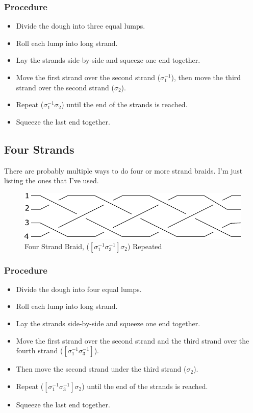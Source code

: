 \documentclass[10pt, openany]{book}
\begin{document}
\subsubsection{Procedure}
\begin{itemize}
  \item Divide the dough into three equal lumps.
  \item Roll each lump into long strand.
  \item Lay the strands side-by-side and squeeze one end together.
  \item Move the first strand over the second strand ($\sigma^{-1}_1$), then move the third strand over the second strand ($\sigma_2$).
  \item Repeat ($\sigma^{-1}_1\sigma_2$) until the end of the strands is reached.
  \item Squeeze the last end together.
\end{itemize}

\subsection{Four Strands}
There are probably multiple ways to do four or more strand braids.  I'm just listing the ones that I've used.

\begin{figure}[h]
  \center
  \includegraphics{Figures/4-strands.pdf}
  \caption{Four Strand Braid, ($[\sigma^{-1}_1\sigma^{-1}_3]\sigma_2$) Repeated}
  \label{fig:4Strand}
\end{figure}

\subsubsection{Procedure}
\begin{itemize}
  \item Divide the dough into four equal lumps.
  \item Roll each lump into long strand.
  \item Lay the strands side-by-side and squeeze one end together.
  \item Move the first strand over the second strand and the third strand over the fourth strand ($[\sigma^{-1}_1\sigma^{-1}_3]$).
  \item Then move the second strand under the third strand ($\sigma_2$).
  \item Repeat ($[\sigma^{-1}_1\sigma^{-1}_3]\sigma_2$) until the end of the strands is reached.
  \item Squeeze the last end together.
\end{itemize}
\end{document}

